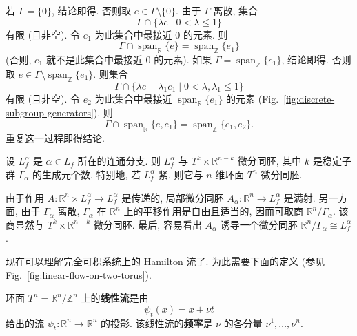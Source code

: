 \begin{RiemannProof}
若 $\Gamma=\{0\}$, 结论即得. 否则取 $e\in\Gamma\setminus\{0\}$. 由于 $\Gamma$ 离散, 集合
\[
  \Gamma\cap\{\lambda e\mid 0<\lambda\leq1\}
\]
有限 (且非空). 令 $e_1$ 为此集合中最接近 $0$ 的元素. 则
\[
  \Gamma\cap\operatorname{span}_{\mathbb{R}}\{e\}
  =\operatorname{span}_{\mathbb{Z}}\{e_1\}
\]
(否则, $e_1$ 就不是此集合中最接近 $0$ 的元素). 如果 $\Gamma=\operatorname{span}_{\mathbb{Z}}\{e_1\}$, 结论即得. 否则取 $e\in\Gamma\setminus\operatorname{span}_{\mathbb{Z}}\{e_1\}$. 则集合
\[
  \Gamma\cap\{\lambda e+\lambda_1e_1\mid 0<\lambda,\lambda_1\leq1\}
\]
有限 (且非空). 令 $e_2$ 为此集合中最接近 $\operatorname{span}_{\mathbb{R}}\{e_1\}$ 的元素 (Fig.~\ref{fig:discrete-subgroup-generators}). 则
\[
  \Gamma\cap\operatorname{span}_{\mathbb{R}}\{e,e_1\}
  =\operatorname{span}_{\mathbb{Z}}\{e_1,e_2\}.
\]
重复这一过程即得结论.
\end{RiemannProof}

\begin{RiemannProposition}\label{prop:topology-of-invariant-level-components}
设 $L_f^\alpha$ 是 $\alpha\in L_f$ 所在的连通分支. 则 $L_f^\alpha$ 与 $T^k\times\mathbb{R}^{n-k}$ 微分同胚, 其中 $k$ 是稳定子群 $\Gamma_\alpha$ 的生成元个数. 特别地, 若 $L_f^\alpha$ 紧, 则它与 $n$ 维环面 $T^n$ 微分同胚.
\end{RiemannProposition}

\begin{RiemannProof}
由于作用 $A:\mathbb{R}^n\times L_f^\alpha\to L_f^\alpha$ 是传递的, 局部微分同胚 $A_\alpha:\mathbb{R}^n\to L_f^\alpha$ 是满射. 另一方面, 由于 $\Gamma_\alpha$ 离散, $\Gamma_\alpha$ 在 $\mathbb{R}^n$ 上的平移作用是自由且适当的, 因而可取商 $\mathbb{R}^n/\Gamma_\alpha$. 该商显然与 $T^k\times\mathbb{R}^{n-k}$ 微分同胚. 最后, 容易看出 $A_\alpha$ 诱导一个微分同胚 $\mathbb{R}^n/\Gamma_\alpha\cong L_f^\alpha$.
\end{RiemannProof}

现在可以理解完全可积系统上的 Hamilton 流了. 为此需要下面的定义 (参见 Fig.~\ref{fig:linear-flow-on-two-torus}).

\begin{RiemannDefinition}\label{def:linear-flow-and-frequencies-on-torus}
环面 $T^n=\mathbb{R}^n/\mathbb{Z}^n$ 上的\textbf{线性流}是由
\[
  \psi_t(x)=x+\nu t
\]
给出的流 $\psi_t:\mathbb{R}^n\to\mathbb{R}^n$ 的投影. 该线性流的\textbf{频率}是 $\nu$ 的各分量 $\nu^1,\ldots,\nu^n$.
\end{RiemannDefinition}

